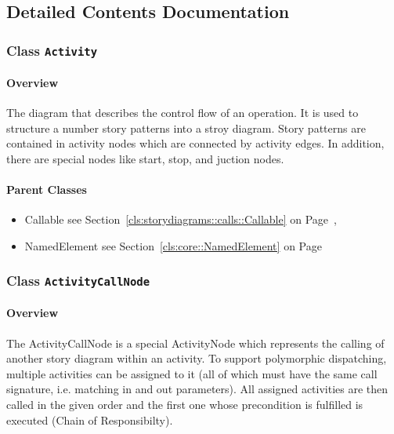 		



\subsection{Detailed Contents Documentation}
\subsubsection{\Large{Class \bfseries \texttt{Activity}\normalfont}}
\label{cls:storydiagrams::activities::Activity} 
\paragraph{Overview}

	
			
The diagram that describes the control flow of an operation. It is used to structure a number story patterns into a stroy diagram. Story patterns are contained in activity nodes which are connected by activity edges. In addition, there are special nodes like start, stop, and juction nodes.  	
		
	



\paragraph{Parent Classes}
\begin{itemize}
\item Callable see Section~\ref{cls:storydiagrams::calls::Callable} on Page~\pageref{cls:storydiagrams::calls::Callable}, \item NamedElement see Section~\ref{cls:core::NamedElement} on Page~\pageref{cls:core::NamedElement}\end{itemize}
\subsubsection{\Large{Class \bfseries \texttt{ActivityCallNode}\normalfont}}
\label{cls:storydiagrams::activities::ActivityCallNode} 
\paragraph{Overview}

	
			
The ActivityCallNode is a special ActivityNode which represents the calling of another story diagram within an activity.
To support polymorphic dispatching, multiple activities can be assigned to it (all of which must have the same call signature, i.e. matching in and out parameters). All assigned activities are then called in the given order and the first one whose precondition is fulfilled is executed (Chain of Responsibilty).	
		
